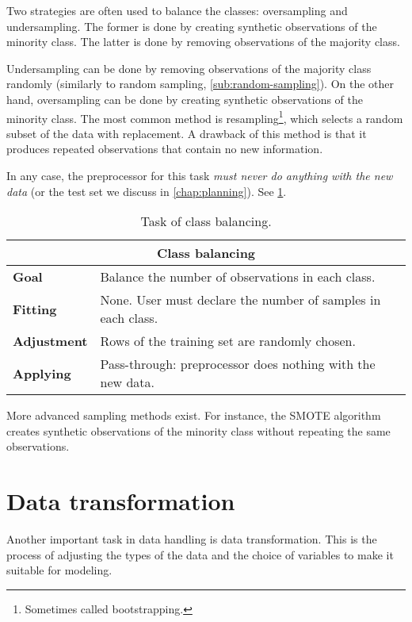 Two strategies are often used to balance the classes: oversampling and undersampling.  The
former is done by creating synthetic observations of the minority class.  The latter is
done by removing observations of the majority class.

Undersampling can be done by removing observations of the majority class randomly
(similarly to random sampling, \cref{sub:random-sampling}).  On the other hand,
oversampling can be done by creating synthetic observations of the minority class.  The
most common method is resampling\footnote{Sometimes called bootstrapping.}, which selects
a random subset of the data with replacement.  A drawback of this method is that it
produces repeated observations that contain no new information.

In any case, the preprocessor for this task \emph{must never do anything with the new
data} (or the test set we discuss in \cref{chap:planning}).  See
\cref{tab:class-balancing}.

\begin{table}\caption{Task of class balancing.}
  \centering
  \begin{tabular}{lp{6cm}}
    \toprule
    \multicolumn{2}{c}{\textbf{Class balancing}} \\
    \midrule
    \textbf{Goal} &
      Balance the number of observations in each class. \\
    \textbf{Fitting} &
      None. User must declare the number of samples in each class. \\
    \textbf{Adjustment} &
      Rows of the training set are randomly chosen. \\
    \textbf{Applying} &
      Pass-through: preprocessor does nothing with the new data. \\
    \bottomrule
  \end{tabular}
  \label{tab:class-balancing}
\end{table}

More advanced sampling methods exist.  For instance, the SMOTE
algorithm creates synthetic observations of the minority
class without repeating the same observations.

\section{Data transformation}

Another important task in data handling is data transformation.  This is the process of
adjusting the types of the data and the choice of variables to make it suitable for
modeling.

